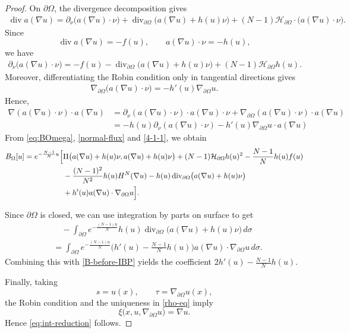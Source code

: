 \documentclass[10pt,a4paper]{amsart}
\numberwithin{equation}{section}
\newcommand{\pa}{\partial}
\begin{document}
\begin{proof}
On $\partial\Omega$, the divergence decomposition gives
\begin{align}\label{boundary-div-decomposition}
    \operatorname{div}a(\nabla u) = \partial_\nu\bigl(a(\nabla u)\cdot\nu\bigr) + \operatorname{div}_{\pa \Omega} \bigl(a(\nabla u)+h(u)\nu\bigr) 
    +(N-1) \mathcal{H}_{\pa \Omega} \cdot \bigl(a(\nabla u)\cdot\nu\bigr).
\end{align}
Since
\[
    \operatorname{div}a(\nabla u)=-f(u), \qquad a(\nabla u)\cdot\nu=-h(u),
\]
we have
\begin{align}\label{normal-flux}
    \partial_\nu\bigl(a(\nabla u)\cdot\nu\bigr) = -f(u) -\operatorname{div}_{\pa \Omega} \bigl(a(\nabla u) + h(u)\nu\bigr) + (N-1)\mathcal{H}_{\pa \Omega} h(u).
\end{align}
Moreover, differentiating the Robin condition only in tangential
directions gives
\begin{align*}
    \nabla_{\pa \Omega}\bigl(a(\nabla u)\cdot\nu\bigr) =-h'(u)\nabla_{\pa \Omega} u.
\end{align*}
Hence,
\begin{align}\label{4-1-1}
    \nabla(a(\nabla u) \cdot \nu) \cdot a(\nabla u) & = \pa_{\nu} (a(\nabla u) \cdot \nu) \cdot a(\nabla u) \cdot \nu + \nabla_{\pa \Omega} (a(\nabla u) \cdot \nu) \cdot a(\nabla u) \\
    & = -h(u) \pa_{\nu} (a(\nabla u) \cdot \nu) - h'(u) \nabla_{\pa \Omega} u \cdot a(\nabla u) \nonumber
\end{align}
From \eqref{eq:BOmega}, \eqref{normal-flux} and \eqref{4-1-1}, we obtain
\begin{align}\label{B-before-IBP}
    B_\Omega[u] =e^{-\frac{N-1}{N} u}\Bigl[ & \Pi\bigl(a(\nabla u)+h(u)\nu, a(\nabla u)+h(u)\nu\bigr) +(N-1)\mathcal{H}_{\pa \Omega} h(u)^2 - \frac{N-1}{N} h(u)f(u) \nonumber\\
    & -\frac{(N-1)^2}{N^2}h(u)H^N(\nabla u) -h(u) \operatorname{div}_{\pa \Omega} \bigl(a(\nabla u)+h(u)\nu\bigr) \nonumber\\
    & +h'(u)a(\nabla u)\cdot\nabla_{\pa \Omega} u \Bigr].
\end{align}

Since $\partial\Omega$ is closed, we can use integration by parts on  surface to get
\begin{align}
    &\quad-\int_{\partial\Omega}e^{- \frac{(N-1)u}{N}}h(u) \operatorname{div}_{\pa \Omega} \bigl(a(\nabla u)+h(u)\nu\bigr)\,d\sigma \nonumber\\
    & = \int_{\partial\Omega}e^{- \frac{(N-1)u}{N}} \bigg( h'(u)- \frac{N-1}{N} h(u) \bigg) a(\nabla u)\cdot\nabla_{\pa \Omega} u\,d\sigma.
\end{align}
Combining this with \eqref{B-before-IBP} yields the coefficient $2h'(u)- \frac{N-1}{N} h(u)$.

Finally, taking
\[
    s=u(x),\qquad \tau=\nabla_{\pa \Omega} u(x),
\]
the Robin condition and the uniqueness in \eqref{rho-eq} imply
\[
    \xi\bigl(x,u,\nabla_{\pa \Omega} u\bigr)=\nabla u.
\]
Hence \eqref{eq:int-reduction} follows.
\end{proof}
\end{document}
